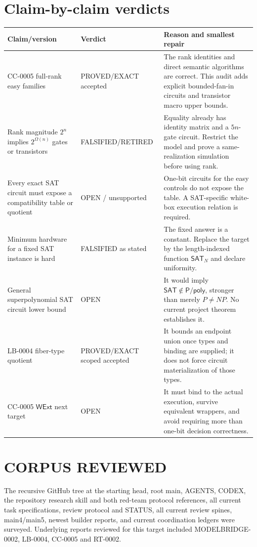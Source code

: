 \documentclass[11pt]{article}
\newcommand{\SAT}{\mathsf{SAT}}
\begin{document}
\section{Claim-by-claim verdicts}
\begin{longtable}{p{}p{}p{}}
\toprule Claim/version&Verdict&Reason and smallest repair\\\midrule\endhead
CC-0005 full-rank easy families
&PROVED/EXACT accepted&The rank identities and direct semantic algorithms
are correct.  This audit adds explicit bounded-fan-in circuits and transistor
macro upper bounds.\\
Rank magnitude $2^n$ implies $2^{\Omega(n)}$ gates or transistors
&FALSIFIED/RETIRED&Equality already has identity matrix and a $5n$-gate
circuit.  Restrict the model and prove a same-realization simulation before
using rank.\\
Every exact SAT circuit must expose a compatibility table or quotient
&OPEN / unsupported&One-bit circuits for the easy controls do not expose the
table.  A SAT-specific white-box execution relation is required.\\
Minimum hardware for a fixed SAT instance is hard
&FALSIFIED as stated&The fixed answer is a constant.  Replace the target by
the length-indexed function $\SAT_N$ and declare uniformity.\\
General superpolynomial SAT circuit lower bound
&OPEN&It would imply $\SAT\notin\mathsf{P/poly}$, stronger than merely
$P\ne NP$.  No current project theorem establishes it.\\
LB-0004 fiber-type quotient
&PROVED/EXACT scoped accepted&It bounds an endpoint union once types and
binding are supplied; it does not force circuit materialization of those
types.\\
CC-0005 $\mathsf{WExt}$ next target
&OPEN&It must bind to the actual execution, survive equivalent wrappers, and
avoid requiring more than one-bit decision correctness.\\
\bottomrule
\end{longtable}

\section{CORPUS REVIEWED}
The recursive GitHub tree at the starting head, root main, AGENTS, CODEX,
the repository research skill and both red-team protocol references, all
current task specifications, review protocol and STATUS, all current review
spines, main4/main5, newest builder reports, and current coordination ledgers
were surveyed.  Underlying reports reviewed for this target included
MODELBRIDGE-0002, LB-0004, CC-0005 and RT-0002.
\end{document}
